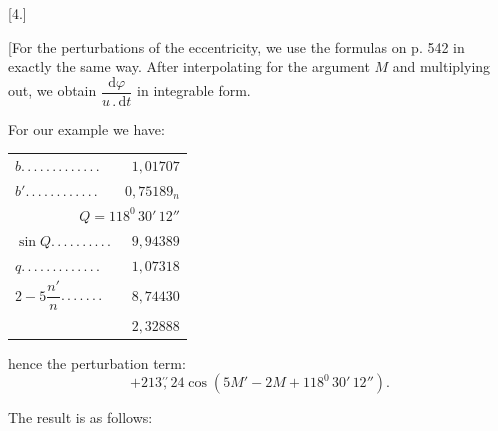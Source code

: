 \begin{landscape}
\begingroup
\fontsize{10}{13}\selectfont
{}
\renewcommand{\headrulewidth}{0pt}
\par\medskip
{}
\begin{center}[4.]\end{center}
\par\noindent\hspace*{\parindent}[For the perturbations of the eccentricity, we use the formulas on p. 542 in exactly the same way. After interpolating for the argument \(M\) and multiplying out, we obtain \(\dfrac{\mathrm{d}\varphi}{u\mathbin{.}\mathrm{d}t}\) in integrable form.
\par\noindent\hspace*{\parindent}For our example we have:
\par
\begingroup\small
\noindent\begin{minipage}[c]{.43\textwidth}
\begin{tabular}{@{}lr@{}}
\(b\)\enspace .\,.\,.\,.\,.\,.\,.\,.\,.\,.\,.\,.\,.&\(1{,}01707\)\\
\(b'\)\enspace .\,.\,.\,.\,.\,.\,.\,.\,.\,.\,.\,.&\(0{,}75189_n\)\\
\multicolumn{2}{r}{\(Q=118^0\,30'\,12''\)}\\
\(\sin Q\)\enspace .\,.\,.\,.\,.\,.\,.\,.\,.\,.&\(9{,}94389\)\\
\(q\)\enspace .\,.\,.\,.\,.\,.\,.\,.\,.\,.\,.\,.\,.&\(1{,}07318\)\\
\(2-5\dfrac{n'}{n}\)\enspace .\,.\,.\,.\,.\,.\,.&\(8{,}74430\)\\
\hline
&\(2{,}32888\)
\end{tabular}
\end{minipage}\hfill
\begin{minipage}[c]{.55\textwidth}
hence the perturbation term:
\[
+213\overset{\prime\prime}{,}24\cos(5M'-2M+118^0\,30'\,12'').
\]
\end{minipage}\par
\endgroup
\clearpage
\endgroup
\end{landscape}
\begingroup
{}
\renewcommand{\headrulewidth}{0pt}
\par\noindent\hspace*{\parindent}The result is as follows:
\begingroup\small

